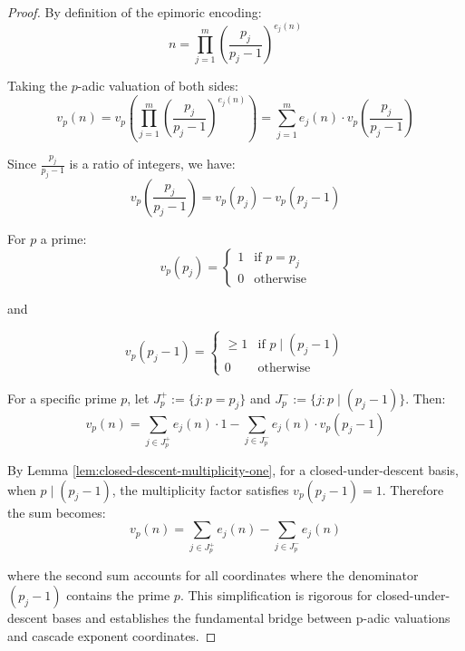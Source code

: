 \begin{proof}

By definition of the epimoric encoding:
\begin{equation}
n = \prod_{j=1}^{m} \left(\frac{p_j}{p_j - 1}\right)^{e_j(n)}
\end{equation}

Taking the $p$-adic valuation of both sides:
\begin{equation}
v_p(n) = v_p\left(\prod_{j=1}^{m} \left(\frac{p_j}{p_j - 1}\right)^{e_j(n)}\right) = \sum_{j=1}^{m} e_j(n) \cdot v_p\left(\frac{p_j}{p_j - 1}\right)
\end{equation}

Since $\frac{p_j}{p_j - 1}$ is a ratio of integers, we have:
\begin{equation}
v_p\left(\frac{p_j}{p_j - 1}\right) = v_p(p_j) - v_p(p_j - 1)
\end{equation}

For $p$ a prime:
\begin{equation}
v_p(p_j) = \begin{cases} 1 & \text{if } p = p_j \\ 0 & \text{otherwise} \end{cases}
\end{equation}

and

\begin{equation}
v_p(p_j - 1) = \begin{cases} \geq 1 & \text{if } p \mid (p_j - 1) \\ 0 & \text{otherwise} \end{cases}
\end{equation}

For a specific prime $p$, let $J_p^+ := \{j : p = p_j\}$ and $J_p^- := \{j : p \mid (p_j - 1)\}$. Then:
\begin{equation}
v_p(n) = \sum_{j \in J_p^+} e_j(n) \cdot 1 - \sum_{j \in J_p^-} e_j(n) \cdot v_p(p_j - 1)
\end{equation}

By Lemma \ref{lem:closed-descent-multiplicity-one}, for a closed-under-descent basis, when $p \mid (p_j - 1)$, the multiplicity factor satisfies $v_p(p_j - 1) = 1$. Therefore the sum becomes:
\begin{equation}
v_p(n) = \sum_{j \in J_p^+} e_j(n) - \sum_{j \in J_p^-} e_j(n)
\end{equation}

where the second sum accounts for all coordinates where the denominator $(p_j - 1)$ contains the prime $p$. This simplification is rigorous for closed-under-descent bases and establishes the fundamental bridge between p-adic valuations and cascade exponent coordinates.

\end{proof}

